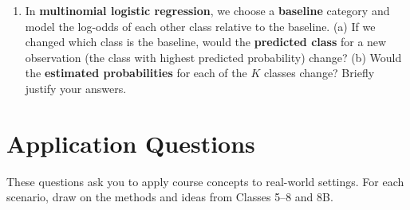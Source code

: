 \documentclass[11pt]{article}
\begin{document}
\begin{enumerate}[leftmargin=*, resume]
\item In \textbf{multinomial logistic regression}, we choose a \textbf{baseline} category and model the log-odds of each other class relative to the baseline. (a) If we changed which class is the baseline, would the \textbf{predicted class} for a new observation (the class with highest predicted probability) change? (b) Would the \textbf{estimated probabilities} for each of the $K$ classes change? Briefly justify your answers.

\end{enumerate}

\newpage
\section*{Application Questions}

These questions ask you to apply course concepts to real-world settings. For each scenario, draw on the methods and ideas from Classes 5--8 and 8B.

\bigskip
\end{document}
